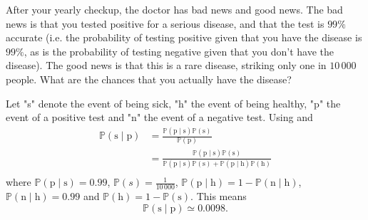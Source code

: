\begin{example}
	After your yearly checkup, the doctor has bad news and good news. The bad news is that you tested positive for a serious disease, and that the test is $99\%$ accurate (i.e. the probability of testing positive given that you have the disease is $99\%$, as is the probability of testing negative given that you don't have the disease). The good news is that this is a rare disease, striking only one in $10\,000$ people. What are the chances that you actually have the disease?\newline
	
	Let "s" denote the event of being sick, "h" the event of being healthy, "p" the event of a positive test and "n" the event of a negative test. Using  and 
	\begin{equation}
		\begin{split}
			\mathbb{P}(\text{s}\mid \text{p}) &= \frac{\mathbb{P}(\text{p}\mid \text{s})\mathbb{P}(\text{s})}{\mathbb{P}(\text{p})}\\
			&= \frac{\mathbb{P}(\text{p}\mid \text{s})\mathbb{P}(\text{s})}{\mathbb{P}(\text{p}\mid \text{s})\mathbb{P}(\text{s})+\mathbb{P}(\text{p}\mid \text{h})\mathbb{P}(\text{h})}\\
		\end{split}
	\end{equation}
	where $\mathbb{P}(\text{p}\mid \text{s}) = 0.99$, $\mathbb{P}(s) = \frac{1}{10\, 000}$, $\mathbb{P}(\text{p}\mid \text{h})=1-\mathbb{P}(\text{n}\mid \text{h})$, $\mathbb{P}(\text{n}\mid \text{h})=0.99$ and $\mathbb{P}(\text{h})=1-\mathbb{P}(\text{s})$. This means
	\begin{equation}
		\mathbb{P}(\text{s}\mid \text{p}) \simeq 0.0098.
	\end{equation}		
\end{example}


